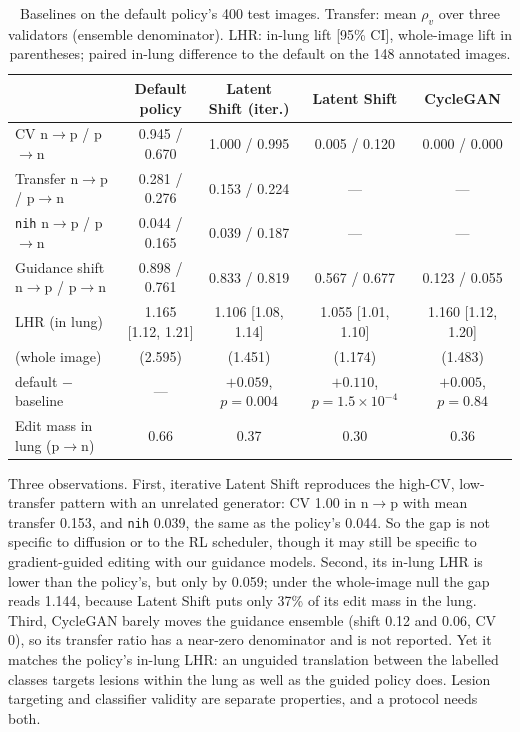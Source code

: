 \begin{table}[t]
\centering
\caption{Baselines on the default policy's 400 test images. Transfer: mean $\rho_v$ over three validators (ensemble denominator). LHR: in-lung lift [95\% CI], whole-image lift in parentheses; paired in-lung difference to the default on the 148 annotated images.}
\label{tab:suppl-baselines}
\scriptsize
\setlength{\tabcolsep}{2.5pt}
\begin{tabular}{@{}lcccc@{}}
\toprule
& Default policy & Latent Shift (iter.) & Latent Shift & CycleGAN \\
\midrule
CV n$\to$p / p$\to$n & 0.945 / 0.670 & 1.000 / 0.995 & 0.005 / 0.120 & 0.000 / 0.000 \\
Transfer n$\to$p / p$\to$n & 0.281 / 0.276 & 0.153 / 0.224 & --- & --- \\
\texttt{nih} n$\to$p / p$\to$n & 0.044 / 0.165 & 0.039 / 0.187 & --- & --- \\
Guidance shift n$\to$p / p$\to$n & 0.898 / 0.761 & 0.833 / 0.819 & 0.567 / 0.677 & 0.123 / 0.055 \\
LHR (in lung) & 1.165 [1.12, 1.21] & 1.106 [1.08, 1.14] & 1.055 [1.01, 1.10] & 1.160 [1.12, 1.20] \\
\quad (whole image) & (2.595) & (1.451) & (1.174) & (1.483) \\
\quad default $-$ baseline & --- & $+0.059$, $p{=}0.004$ & $+0.110$, $p{=}1.5{\times}10^{-4}$ & $+0.005$, $p{=}0.84$ \\
Edit mass in lung (p$\to$n) & 0.66 & 0.37 & 0.30 & 0.36 \\
\bottomrule
\end{tabular}
\end{table}

Three observations. First, iterative Latent Shift reproduces the high-CV, low-transfer pattern with an unrelated generator: CV 1.00 in n$\to$p with mean transfer 0.153, and \texttt{nih} 0.039, the same as the policy's 0.044. So the gap is not specific to diffusion or to the RL scheduler, though it may still be specific to gradient-guided editing with our guidance models. Second, its in-lung LHR is lower than the policy's, but only by 0.059; under the whole-image null the gap reads 1.144, because Latent Shift puts only 37\% of its edit mass in the lung. Third, CycleGAN barely moves the guidance ensemble (shift 0.12 and 0.06, CV 0), so its transfer ratio has a near-zero denominator and is not reported. Yet it matches the policy's in-lung LHR: an unguided translation between the labelled classes targets lesions within the lung as well as the guided policy does. Lesion targeting and classifier validity are separate properties, and a protocol needs both.

